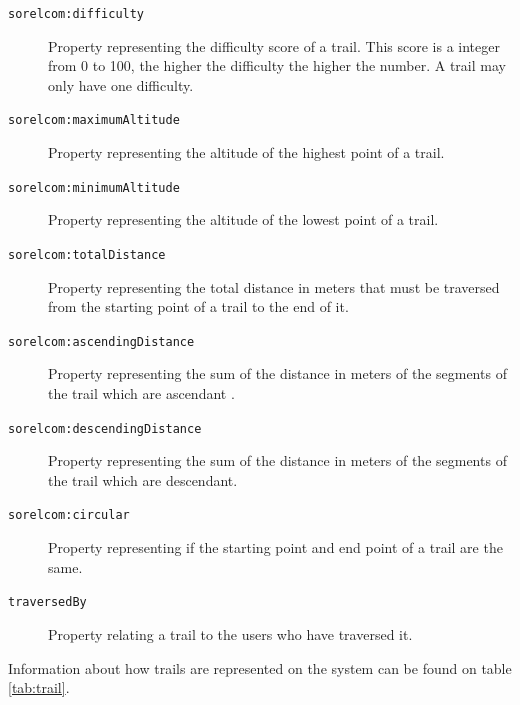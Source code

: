 \begin{description}
\item[\texttt{sorelcom:difficulty}] Property representing the difficulty score of a trail. This score is a integer from 0 to 100, the higher the difficulty the higher the number. A trail may only have one difficulty.
\item[\texttt{sorelcom:maximumAltitude}] Property representing the altitude of the highest point of a trail.
\item[\texttt{sorelcom:minimumAltitude}] Property representing the altitude of the lowest point of a trail.
\item[\texttt{sorelcom:totalDistance}] Property representing the total distance in meters that must be traversed from the starting point of a trail to the end of it.
\item[\texttt{sorelcom:ascendingDistance}] Property representing the sum of the distance in meters of the segments of the trail which are ascendant .
\item[\texttt{sorelcom:descendingDistance}] Property representing the sum of the distance in meters of the segments of the trail which are descendant.
\item[\texttt{sorelcom:circular}] Property representing if the starting point and end point of a trail are the same.
\item[\texttt{traversedBy}] Property relating a trail to the users who have traversed it.
\end{description}

Information about how trails are represented on the system can be found on table \ref{tab:trail}.

